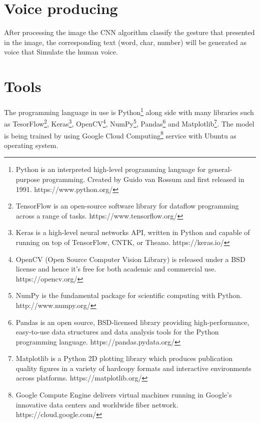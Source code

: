 \documentclass[12pt]{report}
\begin{document}
                    
                    \newpage

        \section{Voice producing}
         
            After processing the image the CNN algorithm classify the gesture
            that presented in the image, the corresponding text (word, char, number)
            will be generated as voice that Simulate the human voice. 
        
        \section{Tools}
         
            The programming language in use is Python\footnote{Python is an interpreted high-level programming language for general-purpose programming. Created by Guido van Rossum and first released in 1991. https://www.python.org/} along side with many
            libraries such as TesorFlow\footnote{TensorFlow is an open-source software library for dataflow programming across a range of tasks. https://www.tensorflow.org/},
            Keras\footnote{Keras is a high-level neural networks API, written in Python and capable of running on top of TensorFlow, CNTK, or Theano. https://keras.io/}, 
            OpenCV\footnote{OpenCV (Open Source Computer Vision Library) is released under a BSD license and hence it’s free for both academic and commercial use. https://opencv.org/}, 
            NumPy\footnote{NumPy is the fundamental package for scientific computing with Python. http://www.numpy.org/}, 
            Pandas\footnote{Pandas is an open source, BSD-licensed library providing high-performance, easy-to-use data structures and data analysis tools for the Python programming language. https://pandas.pydata.org/}
            and Matplotlib\footnote{Matplotlib is a Python 2D plotting library which produces publication quality figures in a variety of hardcopy formats and interactive environments across platforms. https://matplotlib.org/}.
            The model is being trained by using Google Cloud Computing\footnote{Google Compute Engine delivers virtual machines running in Google's innovative data centers and worldwide fiber network. https://cloud.google.com/} service with Ubuntu as operating system.
        
         

        
    
\end{document}
